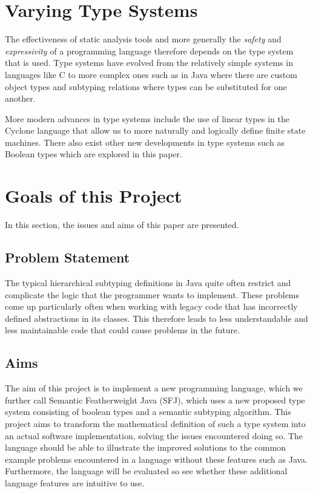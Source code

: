 \documentclass{l4proj}
\begin{document}
\section{Varying Type Systems}

The effectiveness of static analysis tools and more generally the \emph{safety} and \emph{expressivity} of a programming language therefore depends on the type system that is used.
Type systems have evolved from the relatively simple systems in languages like C to more complex ones such as in Java where there are custom object types and subtyping relations where types can be substituted for one another.

More modern advances in type systems include the use of linear types in the Cyclone \citep{grossman2002} language that allow us to more naturally and logically define finite state machines.
There also exist other new developments in type systems such as Boolean types which are explored in this paper.

\section{Goals of this Project}

In this section, the issues and aims of this paper are presented.

\subsection{Problem Statement}

The typical hierarchical subtyping definitions in Java quite often restrict and complicate the logic that the programmer wants to implement.
These problems come up particularly often when working with legacy code that has incorrectly defined abstractions in its classes.
This therefore leads to less understandable and less maintainable code that could cause problems in the future.

\subsection{Aims}

The aim of this project is to implement a new programming language, which we further call Semantic Featherweight Java (SFJ), which uses a new proposed type system consisting of boolean types and a semantic subtyping algorithm.
This project aims to transform the mathematical definition of such a type system into an actual software implementation, solving the issues encountered doing so.
The language should be able to illustrate the improved solutions to the common example problems encountered in a language without these features such as Java.
Furthermore, the language will be evaluated so see whether these additional language features are intuitive to use.
\end{document}
